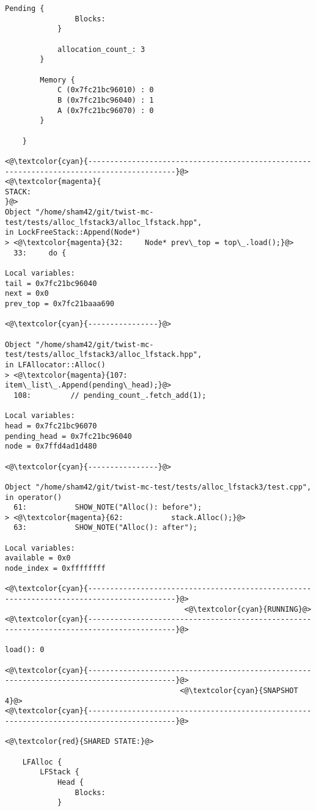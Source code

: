 \begin{adjustwidth}{-3.3cm}{-1cm}
\begin{allintypewriter}
\begin{multicols*}{2}
\begin{lstlisting}[numbers=none]
		    Pending {
			    Blocks: 
		    }

		    allocation_count_: 3
	    }

	    Memory {
		    C (0x7fc21bc96010) : 0
		    B (0x7fc21bc96040) : 1
		    A (0x7fc21bc96070) : 0
	    }

    }

<@\textcolor{cyan}{------------------------------------------------------------------------------------------}@>
<@\textcolor{magenta}{
STACK:
}@>
Object "/home/sham42/git/twist-mc-test/tests/alloc_lfstack3/alloc_lfstack.hpp",
in LockFreeStack::Append(Node*)
> <@\textcolor{magenta}{32:     Node* prev\_top = top\_.load();}@>
  33:     do {

Local variables: 
tail = 0x7fc21bc96040
next = 0x0
prev_top = 0x7fc21baaa690

<@\textcolor{cyan}{----------------}@>

Object "/home/sham42/git/twist-mc-test/tests/alloc_lfstack3/alloc_lfstack.hpp",
in LFAllocator::Alloc()
> <@\textcolor{magenta}{107:         item\_list\_.Append(pending\_head);}@>
  108:         // pending_count_.fetch_add(1);

Local variables: 
head = 0x7fc21bc96070
pending_head = 0x7fc21bc96040
node = 0x7ffd4ad1d480

<@\textcolor{cyan}{----------------}@>

Object "/home/sham42/git/twist-mc-test/tests/alloc_lfstack3/test.cpp",
in operator()
  61:           SHOW_NOTE("Alloc(): before");
> <@\textcolor{magenta}{62:           stack.Alloc();}@>
  63:           SHOW_NOTE("Alloc(): after");

Local variables: 
available = 0x0
node_index = 0xffffffff

<@\textcolor{cyan}{------------------------------------------------------------------------------------------}@>
                                         <@\textcolor{cyan}{RUNNING}@>
<@\textcolor{cyan}{------------------------------------------------------------------------------------------}@>

load(): 0

<@\textcolor{cyan}{------------------------------------------------------------------------------------------}@>
                                        <@\textcolor{cyan}{SNAPSHOT 4}@>
<@\textcolor{cyan}{------------------------------------------------------------------------------------------}@>

<@\textcolor{red}{SHARED STATE:}@>

    LFAlloc {
	    LFStack {
		    Head {
			    Blocks: 
		    }


\end{lstlisting}
\end{multicols*}
\end{allintypewriter}
\end{adjustwidth}
